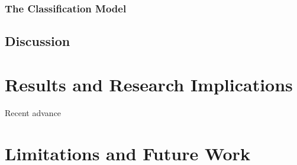\subsubsection{The Classification Model}
\label{subsubsec:PenCTClassification}



\subsection{Discussion}
\label{subsec:PenCTDiscussion}



\section{Results and Research Implications}
\label{sec:PenImplications}

Recent advance


\section{Limitations and Future Work}
\label{sec:PenLimitations}